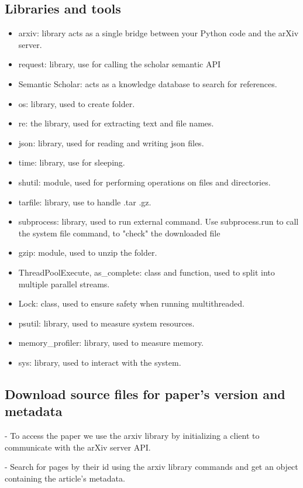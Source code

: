 \documentclass[12pt]{article}
\begin{document}
\subsection{Libraries and tools}
\begin{itemize}
\item arxiv: library acts as a single bridge between your Python code and the arXiv server.
\item request: library, use for calling the scholar semantic API
\item Semantic Scholar: acts as a knowledge database to search for references.
\item os: library, used to create folder.
\item re: the library, used for extracting text and file names.
\item json: library, used for reading and writing json files.
\item time: library, use for sleeping.
\item shutil: module, used for performing operations on files and directories.
\item tarfile: library, use to handle .tar .gz.
\item subprocess: library, used to run external command. Use subprocess.run to call the system file command, to "check" the downloaded file
\item gzip: module, used to unzip the folder.
\item ThreadPoolExecute, as\_complete: class and function, used to split into multiple parallel streams.
\item Lock: class, used to ensure safety when running multithreaded.
\item psutil: library, used to measure system resources.
\item memory\_profiler: library, used to measure memory.
\item sys: library, used to interact with the system.

\end{itemize}

\subsection{Download source files for paper's version and metadata}
- To access the paper we use the arxiv library by initializing a client to communicate with the arXiv server API.

- Search for pages by their id using the arxiv library commands and get an object containing the article's metadata.
\end{document}
